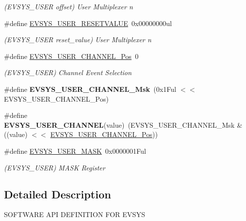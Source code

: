 \begin{DoxyCompactItemize}
\begin{DoxyCompactList}\small\item\em (E\+V\+S\+Y\+S\+\_\+\+U\+S\+E\+R offset) User Multiplexer n \end{DoxyCompactList}\item 
\hypertarget{group___s_a_m_l21___e_v_s_y_s_gaf4ba09be942a94f1cb7a9ed23ac108ab}{}\#define \hyperlink{group___s_a_m_l21___e_v_s_y_s_gaf4ba09be942a94f1cb7a9ed23ac108ab}{E\+V\+S\+Y\+S\+\_\+\+U\+S\+E\+R\+\_\+\+R\+E\+S\+E\+T\+V\+A\+L\+U\+E}~0x00000000ul\label{group___s_a_m_l21___e_v_s_y_s_gaf4ba09be942a94f1cb7a9ed23ac108ab}

\begin{DoxyCompactList}\small\item\em (E\+V\+S\+Y\+S\+\_\+\+U\+S\+E\+R reset\+\_\+value) User Multiplexer n \end{DoxyCompactList}\item 
\hypertarget{group___s_a_m_l21___e_v_s_y_s_ga4ce28148cd49044148eed72085814831}{}\#define \hyperlink{group___s_a_m_l21___e_v_s_y_s_ga4ce28148cd49044148eed72085814831}{E\+V\+S\+Y\+S\+\_\+\+U\+S\+E\+R\+\_\+\+C\+H\+A\+N\+N\+E\+L\+\_\+\+Pos}~0\label{group___s_a_m_l21___e_v_s_y_s_ga4ce28148cd49044148eed72085814831}

\begin{DoxyCompactList}\small\item\em (E\+V\+S\+Y\+S\+\_\+\+U\+S\+E\+R) Channel Event Selection \end{DoxyCompactList}\item 
\hypertarget{group___s_a_m_l21___e_v_s_y_s_ga255273a4399694d342bbccdda41108b8}{}\#define {\bfseries E\+V\+S\+Y\+S\+\_\+\+U\+S\+E\+R\+\_\+\+C\+H\+A\+N\+N\+E\+L\+\_\+\+Msk}~(0x1\+Ful $<$$<$ E\+V\+S\+Y\+S\+\_\+\+U\+S\+E\+R\+\_\+\+C\+H\+A\+N\+N\+E\+L\+\_\+\+Pos)\label{group___s_a_m_l21___e_v_s_y_s_ga255273a4399694d342bbccdda41108b8}

\item 
\hypertarget{group___s_a_m_l21___e_v_s_y_s_ga940b872aa3d233451a79a53fdf82001b}{}\#define {\bfseries E\+V\+S\+Y\+S\+\_\+\+U\+S\+E\+R\+\_\+\+C\+H\+A\+N\+N\+E\+L}(value)~(E\+V\+S\+Y\+S\+\_\+\+U\+S\+E\+R\+\_\+\+C\+H\+A\+N\+N\+E\+L\+\_\+\+Msk \& ((value) $<$$<$ \hyperlink{group___s_a_m_l21___e_v_s_y_s_ga4ce28148cd49044148eed72085814831}{E\+V\+S\+Y\+S\+\_\+\+U\+S\+E\+R\+\_\+\+C\+H\+A\+N\+N\+E\+L\+\_\+\+Pos}))\label{group___s_a_m_l21___e_v_s_y_s_ga940b872aa3d233451a79a53fdf82001b}

\item 
\hypertarget{group___s_a_m_l21___e_v_s_y_s_gae051bcee71e9b6fca121b9c03ff961d8}{}\#define \hyperlink{group___s_a_m_l21___e_v_s_y_s_gae051bcee71e9b6fca121b9c03ff961d8}{E\+V\+S\+Y\+S\+\_\+\+U\+S\+E\+R\+\_\+\+M\+A\+S\+K}~0x0000001\+Ful\label{group___s_a_m_l21___e_v_s_y_s_gae051bcee71e9b6fca121b9c03ff961d8}

\begin{DoxyCompactList}\small\item\em (E\+V\+S\+Y\+S\+\_\+\+U\+S\+E\+R) M\+A\+S\+K Register \end{DoxyCompactList}\end{DoxyCompactItemize}


\subsection{Detailed Description}
S\+O\+F\+T\+W\+A\+R\+E A\+P\+I D\+E\+F\+I\+N\+I\+T\+I\+O\+N F\+O\+R E\+V\+S\+Y\+S 